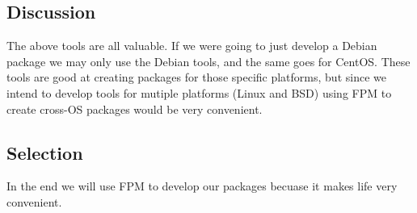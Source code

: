 \subsection{Discussion}

The above tools are all valuable.
If we were going to just develop a Debian package we may only use the Debian tools, and the same goes for CentOS.
These tools are good at creating packages for those specific platforms, but since we intend to develop tools for mutiple platforms (Linux and BSD) using FPM to create cross-OS packages would be very convenient.

\subsection{Selection}

In the end we will use FPM to develop our packages becuase it makes life very convenient.
